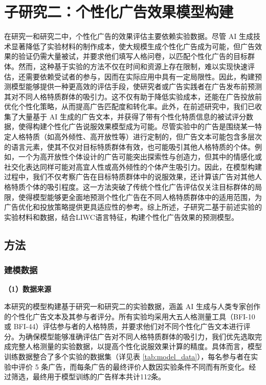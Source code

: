 \section{子研究二：个性化广告效果模型构建} 
在研究一和研究二中，个性化广告的效果评估主要依赖实验数据。尽管 AI 生成技术显著降低了实验材料的制作成本，使大规模生成个性化广告成为可能，但广告效果的验证仍需大量被试，并要求他们填写人格问卷，以匹配个性化广告的目标群体。然而，这种基于实验的方法不仅在时间和资源上存在限制，难以实现快速评估，还需要依赖受试者的参与，因而在实际应用中具有一定局限性。因此，构建预测模型能够提供一种更高效的评估手段，使研究者或广告实践者在广告发布前预测其对不同人格特质群体的吸引力。这不仅有助于降低实验成本，还能在广告投放前优化个性化策略，从而提高广告匹配度和转化率。此外，在前述研究中，我们已收集了大量基于 AI 生成的广告文本，并获得了带有个性化特质信息的被试评分数据，使得构建个性化广告说服效果模型成为可能。尽管实验中的广告是围绕某一特定人格特质（如高外倾性、高开放性等）进行定制的，但广告文本可能包含多层次的语言元素，使其不仅对目标特质群体有效，也可能吸引其他人格特质的个体。例如，一个为高开放性个体设计的广告可能突出探索性与创造力，但其中的情感化或社交化表达同样可能对高宜人性或高外倾性的个体产生吸引力。因此，在模型构建过程中，我们不仅考察广告在目标特质群体中的说服效果，还计算该广告对其他人格特质个体的吸引程度。这一方法突破了传统个性化广告评估仅关注目标群体的局限，使得模型能够更全面地预测个性化广告在不同人格特质群体中的适用范围，为广告优化和投放策略提供更具适应性的参考。综上所述，子研究二基于前述实验的实验材料和数据，结合LIWC语言特征，构建个性化广告效果的预测模型。

\subsection{方法}

\subsubsection{建模数据}

\textbf{（1）数据来源}

本研究的模型构建基于研究一和研究二的实验数据，涵盖 AI 生成与人类专家创作的个性化广告文本及其参与者评分。所有实验均采用大五人格测量工具（BFI-10 或 BFI-44）评估参与者的人格特质，并要求他们对不同个性化广告文本进行评分。为确保模型能够准确评估广告对不同人格特质群体的吸引力，我们优先选取完成完整人格测量的实验数据，以提高个性化说服效果计算的精度。具体而言，模型训练数据整合了多个实验的数据集（详见表 \ref{tab:model_data}），每名参与者在实验中评价 5 条广告，而每条广告的最终评价人数因实验条件不同而有所变化。经过筛选，最终用于模型训练的广告样本共计112条。


